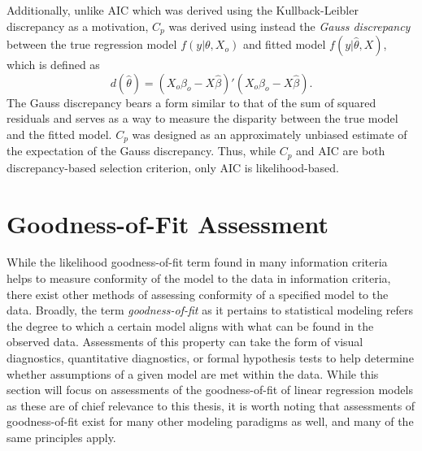 		Additionally, unlike AIC which was derived using the Kullback-Leibler discrepancy as a motivation, $C_p$ was derived using instead the \textit{Gauss discrepancy} between the true regression model $f(y|\theta, X_o)$ and fitted
		model $f(y|\hat{\theta}, X)$, which is defined as
		\begin{equation}
			d(\hat{\theta}) = (X_o \beta_o - X \hat{\beta})'(X_o \beta_o - X \hat{\beta}) .
		\end{equation}
		The Gauss discrepancy bears a form similar to that of the sum of squared residuals and serves as a way to measure the disparity between the true model and the fitted model. $C_p$ was
		designed as an approximately unbiased estimate of the expectation of the Gauss discrepancy. Thus, while $C_p$ and AIC are both discrepancy-based selection criterion, only AIC is
		likelihood-based.
		
		\section{Goodness-of-Fit Assessment}

		While the likelihood goodness-of-fit term found in many information criteria helps to measure conformity of the model to the data in information criteria, there exist other methods of
		assessing conformity of a specified model to the data. Broadly, the term \textit{goodness-of-fit} as it pertains to statistical modeling refers the degree to which a certain model
		aligns with what can be found in the observed data. Assessments of this property can take the form of visual diagnostics, quantitative diagnostics, or formal hypothesis tests to help
		determine whether assumptions of a given model are met within the data. While this section will focus on assessments of the goodness-of-fit of linear regression models as these are of
		chief relevance to this thesis, it is worth noting that assessments of goodness-of-fit exist for many other modeling paradigms as well, and many of the same principles apply.

